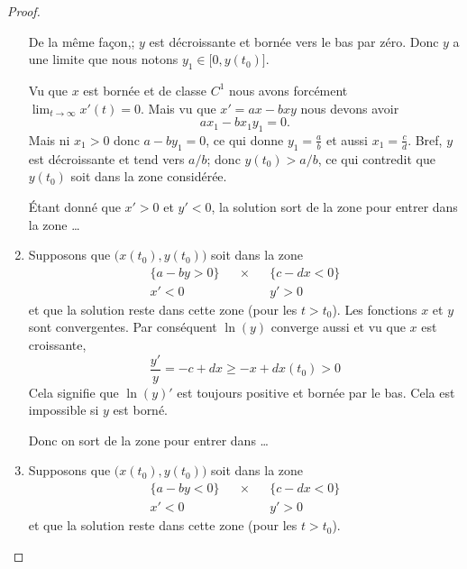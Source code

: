 \begin{proof}
\begin{subproof}
\begin{enumerate}
        De la même façon,; \( y\) est décroissante et bornée vers le bas par zéro. Donc $y$ a une limite que nous notons \( y_1\in\mathopen[ 0 , y(t_0) \mathclose]\). 

        Vu que \( x\) est bornée et de classe \( C^1\) nous avons forcément \( \lim_{t\to \infty} x'(t)=0\). Mais vu que \( x'=ax-bxy\) nous devons avoir
        \begin{equation}
            ax_1-bx_1y_1=0.
        \end{equation}
        Mais ni \( x_1>0\) donc \( a-by_1=0\), ce qui donne \( y_1=\frac{ a }{ b }\) et aussi \( x_1=\frac{ c }{ d }\). Bref, \( y\) est décroissante et tend vers \( a/b\); donc \( y(t_0)>a/b\), ce qui contredit que \( y(t_0)\) soit dans la zone considérée.

        Étant donné que \( x'>0\) et \( y'<0\), la solution sort de la zone pour entrer dans la zone \ldots
    \item
        Supposons que \( \big( x(t_0),y(t_0) \big) \) soit dans la zone
        \begin{subequations}
            \begin{align}
                \{ a-by>0 \}&&\times&& \{ c-dx<0 \}\\
                x'<0&&&&y'>0
            \end{align}
        \end{subequations}
        et que la solution reste dans cette zone (pour les \( t>t_0\)). Les fonctions \( x\) et \( y\) sont convergentes. Par conséquent \( \ln(y)\) converge aussi et vu que \( x\) est croissante,
        \begin{equation}
            \frac{ y' }{ y }=-c+dx\geq -x+dx(t_0)>0
        \end{equation}
        Cela signifie que \( \ln(y)'\) est toujours positive et bornée par le bas. Cela est impossible si \( y\) est borné. 

        Donc on sort de la zone pour entrer dans \ldots
    \item
        Supposons que \( \big( x(t_0),y(t_0) \big) \) soit dans la zone
        \begin{subequations}
            \begin{align}
                \{ a-by<0 \}&&\times&& \{ c-dx<0 \}\\
                x'<0&&&&y'>0
            \end{align}
        \end{subequations}
        et que la solution reste dans cette zone (pour les \( t>t_0\)). 


\end{enumerate}
\end{subproof}
\end{proof}
